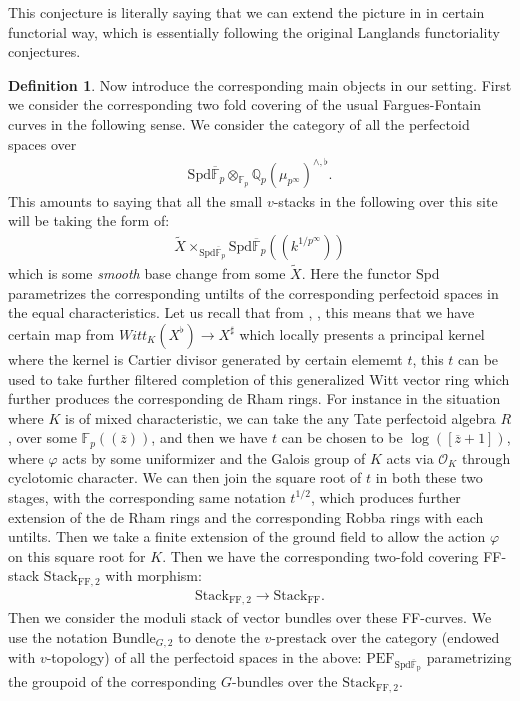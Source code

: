 \documentclass[12pt]{book}
\theoremstyle{definition}
\newtheorem{definition}{Definition}
\begin{document}
\indent This conjecture is literally saying that we can extend the picture in \cite{FS} in certain functorial way, which is essentially following the original Langlands functoriality conjectures. 

\begin{definition}
Now introduce the corresponding main objects in our setting. First we consider the corresponding two fold covering of the usual Fargues-Fontain curves in the following sense. We consider the category of all the perfectoid spaces over 
\begin{align}
\mathrm{Spd}\overline{\mathbb{F}}_p\otimes_{\mathbb{F}_p}\mathbb{Q}_p(\mu_{p^\infty})^{\wedge,\flat}.
\end{align}
This amounts to saying that all the small $v$-stacks in the following over this site will be taking the form of:
\begin{align}
\widetilde{X}\times_{\mathrm{Spd}\overline{\mathbb{F}}_p}\mathrm{Spd}\overline{\mathbb{F}}_p((k^{1/p^\infty}))
\end{align}
which is some \textit{smooth} base change from some $\widetilde{X}$. Here the functor $\mathrm{Spd}$ parametrizes the corresponding untilts of the corresponding perfectoid spaces in the equal characteristics. Let us recall that from \cite{SchI}, \cite{KLI}, \cite{KLII} this means that we have certain map from $Witt_{K}(X^\flat) \rightarrow X^\sharp$ which locally presents a principal kernel where the kernel is Cartier divisor generated by certain elememt $t$, this $t$ can be used to take further filtered completion of this generalized Witt vector ring which further produces the corresponding de Rham rings. For instance in the situation where $K$ is of mixed characteristic, we can take the any Tate perfectoid algebra $R$, over some $\mathbb{F}_p((\overline{z}))$, and then we have $t$ can be chosen to be $\log([\overline{z}+1])$, where $\varphi$ acts by some uniformizer and the Galois group of $K$ acts via $\mathcal{O}_K$ through cyclotomic character. We can then join the square root of $t$ in both these two stages, with the corresponding same notation $t^{1/2}$, which produces further extension of the de Rham rings and the corresponding Robba rings with each untilts. Then we take a finite extension of the ground field to allow the action $\varphi$ on this square root for $K$. Then we have the corresponding two-fold covering FF-stack $\mathrm{Stack}_{\mathrm{FF},2}$ with morphism:
\begin{align}
\mathrm{Stack}_{\mathrm{FF},2}\rightarrow \mathrm{Stack}_{\mathrm{FF}}.
\end{align}
Then we consider the moduli stack of vector bundles over these FF-curves. We use the notation $\mathrm{Bundle}_{G,2}$ to denote the $v$-prestack over the category (endowed with $v$-topology) of all the perfectoid spaces in the above: $\mathrm{PEF}_\mathrm{\mathrm{Spd}\overline{\mathbb{F}}_p}$ parametrizing the groupoid of the corresponding $G$-bundles over the $\mathrm{Stack}_{\mathrm{FF},2}$.
\end{definition}
\end{document}
